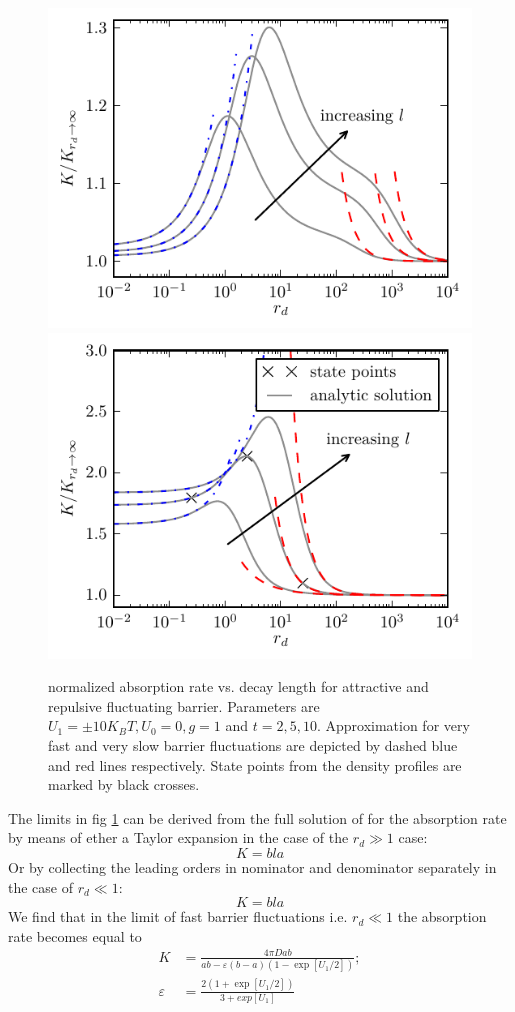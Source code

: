 \documentclass[twocolumn,superscriptaddress]{revtex4}
\begin{document}
\begin{figure}[H]
\includegraphics[width= .5 \textwidth]{plots/ab_rates.pdf}
\includegraphics[width= .5 \textwidth]{plots/rb_rates.pdf}
\caption{normalized absorption rate vs. decay length for attractive and repulsive fluctuating barrier. \newline Parameters are $U_1 = \pm 10 K_B T, U_0= 0, g = 1$ and $t=2,5,10$. Approximation for very fast and very slow barrier fluctuations are depicted by dashed blue and red lines respectively. State points from the density profiles are marked by black crosses.}
\label{fig3}
\end{figure}
The limits in fig \ref{fig3} can be derived from the full solution of for the absorption rate by means of ether a Taylor expansion in the case of the $r_d \gg 1$ case:
\begin{equation}
    K=bla
    \label{rd_large}
\end{equation}
Or by collecting the leading orders in nominator and denominator separately in the case of $r_d \ll 1$:
\begin{equation}
    K=bla
    \label{rd_small}
\end{equation}
We find that in the limit of fast barrier fluctuations i.e. $r_d \ll 1$ the absorption rate becomes equal to
\begin{align}
    K &= \frac{4 \pi D ab}{ab - \varepsilon(b-a)(1-\exp[U_1/2])}; \\
    \varepsilon &= \frac{2(1+\exp[U_1/2])}{3+exp[U_1]}
    \label{kliminf}
\end{align}
\end{document}
